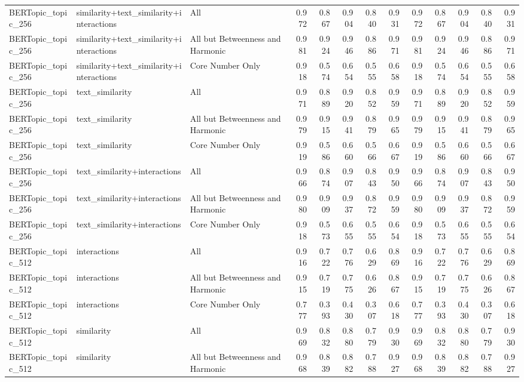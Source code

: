 \begin{tabular}{lllrrrrrrrrrr}
BERTopic\_topic\_256 & similarity+text\_similarity+interactions & All & 0.972 & 0.867 & 0.904 & 0.840 & 0.931 & 0.972 & 0.867 & 0.904 & 0.840 & 0.931 \\
BERTopic\_topic\_256 & similarity+text\_similarity+interactions & All but Betweenness and Harmonic & 0.981 & 0.924 & 0.946 & 0.886 & 0.971 & 0.981 & 0.924 & 0.946 & 0.886 & 0.971 \\
BERTopic\_topic\_256 & similarity+text\_similarity+interactions & Core Number Only & 0.918 & 0.574 & 0.654 & 0.555 & 0.658 & 0.918 & 0.574 & 0.654 & 0.555 & 0.658 \\
BERTopic\_topic\_256 & text\_similarity & All & 0.971 & 0.889 & 0.920 & 0.852 & 0.959 & 0.971 & 0.889 & 0.920 & 0.852 & 0.959 \\
BERTopic\_topic\_256 & text\_similarity & All but Betweenness and Harmonic & 0.979 & 0.915 & 0.941 & 0.879 & 0.965 & 0.979 & 0.915 & 0.941 & 0.879 & 0.965 \\
BERTopic\_topic\_256 & text\_similarity & Core Number Only & 0.919 & 0.586 & 0.660 & 0.566 & 0.667 & 0.919 & 0.586 & 0.660 & 0.566 & 0.667 \\
BERTopic\_topic\_256 & text\_similarity+interactions & All & 0.966 & 0.874 & 0.907 & 0.843 & 0.950 & 0.966 & 0.874 & 0.907 & 0.843 & 0.950 \\
BERTopic\_topic\_256 & text\_similarity+interactions & All but Betweenness and Harmonic & 0.980 & 0.909 & 0.937 & 0.872 & 0.959 & 0.980 & 0.909 & 0.937 & 0.872 & 0.959 \\
BERTopic\_topic\_256 & text\_similarity+interactions & Core Number Only & 0.918 & 0.573 & 0.655 & 0.555 & 0.654 & 0.918 & 0.573 & 0.655 & 0.555 & 0.654 \\
BERTopic\_topic\_512 & interactions & All & 0.916 & 0.722 & 0.776 & 0.629 & 0.869 & 0.916 & 0.722 & 0.776 & 0.629 & 0.869 \\
BERTopic\_topic\_512 & interactions & All but Betweenness and Harmonic & 0.915 & 0.719 & 0.775 & 0.626 & 0.867 & 0.915 & 0.719 & 0.775 & 0.626 & 0.867 \\
BERTopic\_topic\_512 & interactions & Core Number Only & 0.777 & 0.393 & 0.430 & 0.307 & 0.618 & 0.777 & 0.393 & 0.430 & 0.307 & 0.618 \\
BERTopic\_topic\_512 & similarity & All & 0.969 & 0.832 & 0.880 & 0.779 & 0.930 & 0.969 & 0.832 & 0.880 & 0.779 & 0.930 \\
BERTopic\_topic\_512 & similarity & All but Betweenness and Harmonic & 0.968 & 0.839 & 0.882 & 0.788 & 0.927 & 0.968 & 0.839 & 0.882 & 0.788 & 0.927 \\

\end{tabular}
